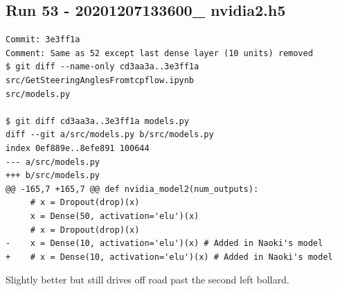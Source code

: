 \subsection{Run 53 - 20201207133600\_ nvidia2.h5 }
\label{app_res:XX}
\begin{verbatim}
Commit: 3e3ff1a
Comment: Same as 52 except last dense layer (10 units) removed
$ git diff --name-only cd3aa3a..3e3ff1a
src/GetSteeringAnglesFromtcpflow.ipynb
src/models.py

$ git diff cd3aa3a..3e3ff1a models.py
diff --git a/src/models.py b/src/models.py
index 0ef889e..8efe891 100644
--- a/src/models.py
+++ b/src/models.py
@@ -165,7 +165,7 @@ def nvidia_model2(num_outputs):
     # x = Dropout(drop)(x)
     x = Dense(50, activation='elu')(x)
     # x = Dropout(drop)(x)
-    x = Dense(10, activation='elu')(x) # Added in Naoki's model
+    # x = Dense(10, activation='elu')(x) # Added in Naoki's model

\end{verbatim}

Slightly better but still drives off road past the second left bollard.


